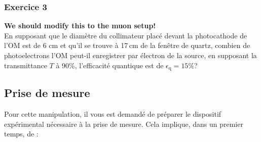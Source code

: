 \subsubsection{Exercice 3}
\textbf{We should modify this to the muon setup!}\\
En supposant que le diam\`etre du collimateur plac\'e devant la photocathode de l'OM est de 6 cm et qu'il se trouve \`a 17\,cm de la fen\^etre de quartz, combien de photoelectrons l'OM peut-il enregistrer par \'electron de la source, en supposant la transmittance $T$ \`a 90\%, l'efficacit\'e quantique est de $\epsilon_\mathrm{q}=15\%$?


\subsection{Prise de mesure}

Pour cette manipulation, il vous est demandé de préparer le dispositif expérimental nécessaire à la prise de mesure. Cela implique, dans un premier temps, de :

\begin{center}
\end{center}

